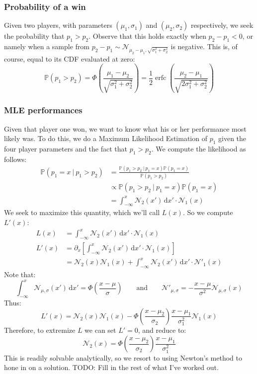 \documentclass[12pt]{article}
\begin{document}
\subsubsection{Probability of a win}
Given two players, with parameters $(\mu_1, \sigma_1)$ and $(\mu_2, \sigma_2)$ respectively, we seek the probability that $p_1 > p_2$.
Observe that this holds exactly when $p_2 - p_1 < 0$, or namely when a sample from $p_2 - p_1 \sim \mathcal{N}_{\mu_2 - \mu_1,\sqrt{\sigma_1^2 + \sigma_2^2}}$ is negative.
This is, of course, equal to its CDF evaluated at zero:
\[
	\mathbb{P}(p_1 > p_2) = \Phi\left(\frac{\mu_1 - \mu_2}{\sqrt{\sigma_1^2 + \sigma_2^2}}\right)
	                      = \frac12 \operatorname{erfc} \left(\frac{\mu_2 - \mu_1}{\sqrt{2\sigma_1^2 + \sigma_2^2}}\right)
\]

\subsubsection{MLE performances}
Given that player one won, we want to know what his or her performance most likely was.
To do this, we do a Maximum Likelihood Estimation of $p_1$ given the four player parameters and the fact that $p_1 > p_2$.
We compute the likelihood as follows:
\begin{align*}
\mathbb{P}(p_1 = x\ |\ p_1 > p_2) &= \frac{\mathbb{P}(p_1 > p_2\ |\ p_1 = x) \mathbb{P}(p_1 = x)}{\mathbb{P}(p_1 > p_2)} \\
&\propto \mathbb{P}(p_1 > p_2\ |\ p_1 = x) \mathbb{P}(p_1 = x) \\
&= \int_{-\infty}^x \mathcal{N}_2(x') \, \mathrm{d}x' \cdot \mathcal{N}_1(x)
\end{align*}
We seek to maximize this quantity, which we'll call $L(x)$.
So we compute $L'(x)$:
\begin{align*}
L(x) &= \int_{-\infty}^x \mathcal{N}_2(x') \, \mathrm{d}x' \cdot \mathcal{N}_1(x) \\
L'(x) &= \partial_x \left[ \int_{-\infty}^x \mathcal{N}_2(x') \, \mathrm{d}x' \cdot \mathcal{N}_1(x) \right] \\
&= \mathcal{N}_2(x) \mathcal{N}_1(x) +
\int_{-\infty}^x \mathcal{N}_2(x') \, \mathrm{d}x' \cdot \mathcal{N}'_1(x)
\end{align*}
Note that:
\[
	\int_{-\infty}^x \mathcal{N}_{\mu, \sigma}(x') \, \mathrm{d}x' = \Phi\left(\frac{x - \mu}{\sigma}\right)
	\qquad \text{and} \qquad
	\mathcal{N}'_{\mu,\sigma} = - \frac{x - \mu}{\sigma^2} \mathcal{N}_{\mu, \sigma}(x)
\]
Thus: 
\[
	L'(x) =
	\mathcal{N}_2(x) \mathcal{N}_1(x) -
	\Phi\left(\frac{x - \mu_2}{\sigma_2}\right) \frac{x - \mu_1}{\sigma_1^2} \mathcal{N}_1(x)
\]
Therefore, to extremize $L$ we can set $L' = 0$, and reduce to:
\[ \mathcal{N}_2(x) = \Phi\left(\frac{x - \mu_2}{\sigma_2}\right) \frac{x - \mu_1}{\sigma_1^2} \]
This is readily solvable analytically, so we resort to using Newton's method to hone in on a solution.
TODO: Fill in the rest of what I've worked out.
\end{document}
